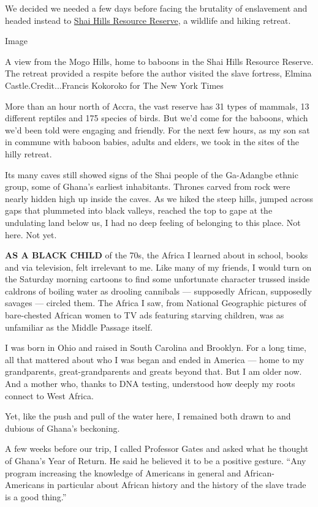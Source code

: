 We decided we needed a few days before facing the brutality of
enslavement and headed instead to
\href{https://shai-hills-resource-reserve.business.site/\#gallery}{Shai
Hills Resource Reserve}, a wildlife and hiking retreat.

Image

A view from the Mogo Hills, home to baboons in the Shai Hills Resource
Reserve. The retreat provided a respite before the author visited the
slave fortress, Elmina Castle.Credit...Francis Kokoroko for The New York
Times

More than an hour north of Accra, the vast reserve has 31 types of
mammals, 13 different reptiles and 175 species of birds. But we'd come
for the baboons, which we'd been told were engaging and friendly. For
the next few hours, as my son sat in commune with baboon babies, adults
and elders, we took in the sites of the hilly retreat.

Its many caves still showed signs of the Shai people of the Ga-Adangbe
ethnic group, some of Ghana's earliest inhabitants. Thrones carved from
rock were nearly hidden high up inside the caves. As we hiked the steep
hills, jumped across gaps that plummeted into black valleys, reached the
top to gape at the undulating land below us, I had no deep feeling of
belonging to this place. Not here. Not yet.

\textbf{AS A BLACK CHILD} of the 70s, the Africa I learned about in
school, books and via television, felt irrelevant to me. Like many of my
friends, I would turn on the Saturday morning cartoons to find some
unfortunate character trussed inside caldrons of boiling water as
drooling cannibals --- supposedly African, supposedly savages ---
circled them. The Africa I saw, from National Geographic pictures of
bare-chested African women to TV ads featuring starving children, was as
unfamiliar as the Middle Passage itself.

I was born in Ohio and raised in South Carolina and Brooklyn. For a long
time, all that mattered about who I was began and ended in America ---
home to my grandparents, great-grandparents and greats beyond that. But
I am older now. And a mother who, thanks to DNA testing, understood how
deeply my roots connect to West Africa.

Yet, like the push and pull of the water here, I remained both drawn to
and dubious of Ghana's beckoning.

A few weeks before our trip, I called Professor Gates and asked what he
thought of Ghana's Year of Return. He said he believed it to be a
positive gesture. ``Any program increasing the knowledge of Americans in
general and African-Americans in particular about African history and
the history of the slave trade is a good thing.''

